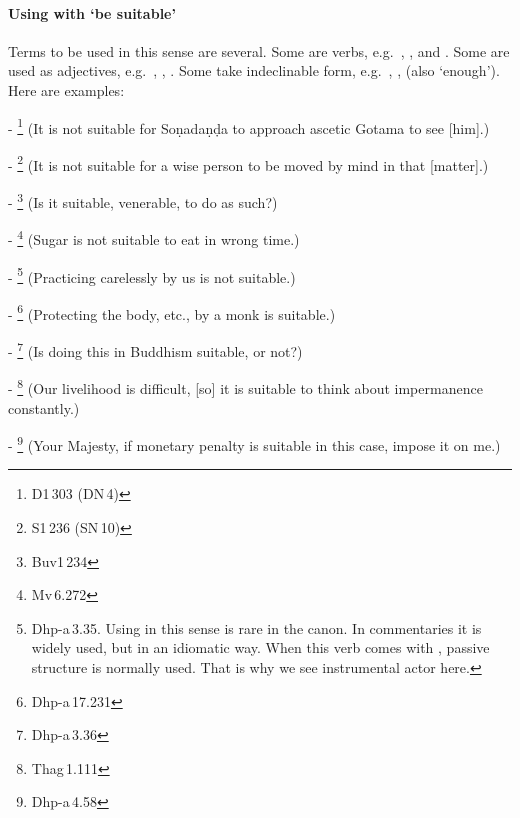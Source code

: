 \paragraph*{Using with `be suitable'} Terms to be used in this sense are several. Some are verbs, e.g.\ , , and . Some are used as adjectives, e.g.\ , , . Some take indeclinable form, e.g.\ , ,  (also `enough'). Here are examples:\par
- \footnote{D1\,303 (DN\,4)} (It is not suitable for So\d nada\d n\d da to approach ascetic Gotama to see [him].)\par
- \footnote{S1\,236 (SN\,10)} (It is not suitable for a wise person to be moved by mind in that [matter].)\par
- \footnote{Buv1\,234} (Is it suitable, venerable, to do as such?)\par
- \footnote{Mv\,6.272} (Sugar is not suitable to eat in wrong time.)\par
- \footnote{Dhp-a\,3.35. Using  in this sense is rare in the canon. In commentaries it is widely used, but in an idiomatic way. When this verb comes with , passive structure is normally used. That is why we see instrumental actor here.} (Practicing carelessly by us is not suitable.)\par
- \footnote{Dhp-a\,17.231} (Protecting the body, etc., by a monk is suitable.)\par
- \footnote{Dhp-a\,3.36} (Is doing this in Buddhism suitable, or not?)\par
- \footnote{Thag\,1.111} (Our livelihood is difficult, [so] it is suitable to think about impermanence constantly.)\par
- \footnote{Dhp-a\,4.58} (Your Majesty, if monetary penalty is suitable in this case, impose it on me.)\par
